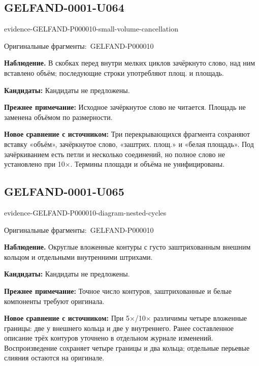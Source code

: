 \documentclass[11pt]{article}
\newcommand{\EvidenceBlock}[4]{%
 \par\smallskip\noindent\begin{minipage}{\linewidth}
 \begin{minipage}[t]{.47\linewidth}\vspace{0pt}\centering
 \csname evidence-#1-#2\endcsname\par
 {\scriptsize\SourceCropCaption\ #1}\par
 \end{minipage}\hfill
 \begin{minipage}[t]{.49\linewidth}\vspace{0pt}\raggedright
 {\small\color{orange!65!black}\textbf{#4} #3}\par
 \end{minipage}
 \end{minipage}\par\smallskip}
\newcommand{\SourceCropCaption}{Оригинальные фрагменты:}\newcommand{\ReadingCaption}{Сомнительное чтение.}\newcommand{\IncompleteCaption}{Неразобранный фрагмент.}\newcommand{\DiagramCaption}{Рисунок и набранное описание.}
\begin{document}
\subsection*{GELFAND-0001-U064}
\EvidenceBlock{GELFAND-P000010}{small-volume-cancellation}{В скобках перед внутри мелких циклов зачёркнуто слово, над ним вставлено объём; последующие строки употребляют площ. и площадь.}{Наблюдение.}
\par\smallskip\noindent\textbf{Кандидаты: } Кандидаты не предложены.\par
\par\smallskip\noindent\textbf{Прежнее примечание: } Исходное зачёркнутое слово не читается. Площадь не заменена объёмом по размерности.\par
\par\smallskip\noindent\textbf{Новое сравнение с источником: } Три перекрывающихся фрагмента сохраняют вставку «объём», зачёркнутое слово, «заштрих. площ.» и «белая площадь». Под зачёркиванием есть петли и несколько соединений, но полное слово не установлено при 10×. Термины площади и объёма не унифицированы.\par

\subsection*{GELFAND-0001-U065}
\EvidenceBlock{GELFAND-P000010}{diagram-nested-cycles}{Округлые вложенные контуры с густо заштрихованным внешним кольцом и отдельными внутренними штрихами.}{Наблюдение.}
\par\smallskip\noindent\textbf{Кандидаты: } Кандидаты не предложены.\par
\par\smallskip\noindent\textbf{Прежнее примечание: } Точное число контуров, заштрихованные и белые компоненты требуют оригинала.\par
\par\smallskip\noindent\textbf{Новое сравнение с источником: } При 5×/10× различимы четыре вложенные границы: две у внешнего кольца и две у внутреннего. Ранее составленное описание трёх контуров уточнено в отдельном журнале изменений. Воспроизведение сохраняет четыре границы и два кольца; отдельные перьевые слияния остаются на оригинале.\par
\end{document}
